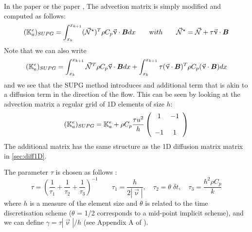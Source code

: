 In the \douar paper \cite{brtf08} or the \fantom paper \cite{thie11},
The advection matrix is simply modified and computed as follows:
\[
({{\mathbb{K}}}_a^e)_{SUPG}
=
\int_{x_k}^{x_{k+1}}   ({\vec {{\mathcal{N}}}}^\star)^T \rho C_p \vec\upnu \cdot {\bm B} dx  
\quad\quad
{\text with}
\quad\quad
{\vec {{\mathcal{N}}}}^\star= {\vec {{\mathcal{N}}}} + \tau \vec \upnu \cdot {\bm B}
\]
Note that we can also write 
\[
({{\mathbb{K}}}_a^e)_{SUPG}
=
\int_{x_k}^{x_{k+1}}   {\vec {{\mathcal{N}}}}^T \rho C_p \vec\upnu \cdot {\bm B} dx  
+
\int_{x_k}^{x_{k+1}}  \tau (\vec \upnu \cdot {\bm B})^T   \rho C_p (\vec\upnu \cdot {\bm B}) dx  
\]
and we see that the SUPG method introduces and additional term that is akin to 
a diffusion term in the direction of the flow.
This can be seen by looking at the advection matrix a regular grid of 1D 
elements of size $h$:
\[
({{\mathbb{K}}}_a^e)_{SUPG}=
{{\mathbb{K}}}_a^e
+
\rho C_p
\frac{\tau u^2}{h}
\left(
\begin{array}{cc}
1 & -1 \\ \\
-1 & 1
\end{array}
\right)
\]
The additional matrix has the same structure as the 1D diffusion matrix matrix in \ref{sec:diff1D}.

The parameter $\tau$ is chosen as follows \cite{teos00}:
\begin{equation}
\tau= \left(\frac{1}{\tau_1} + \frac{1}{\tau_2} + \frac{1}{\tau_3} \right)^{-1}
\qquad
\tau_1=\frac{h}{2 |\vec\upnu|},
\quad
\tau_2 = \theta \; \delta t,
\quad
\tau_3 = \frac{h^2 \rho C_p}{k}
\label{tausupg}
\end{equation}
where $h$ is a measure of the element size and $\theta$ is related to the time
discretisation scheme ($\theta$ = 1/2 corresponds to a mid-point implicit scheme),
and we can define $\gamma=\tau |\vec\upnu|/h$ (see Appendix A of \cite{thie11}). 

